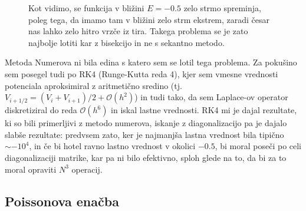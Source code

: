\documentclass[12pt, a4 paper]{article}
\begin{document}
\begin{figure}[H]\centering
	
	\caption{Kot vidimo, se funkcija v bli\v zini $E = -0.5$ zelo strmo spreminja, poleg tega, da imamo tam v bli\v zini
		zelo strm ekstrem, zaradi \v cesar nas lahko zelo hitro vrz\v ce iz tira. Takega problema se je zato
		najbolje lotiti kar z bisekcijo in ne s sekantno metodo.}
	\label{gr0}
\end{figure}

Metoda Numerova ni bila edina s katero sem se lotil tega problema. Za poku\v sino sem posegel tudi po RK4 (Runge-Kutta reda 4),
kjer sem vmesne vrednosti potenciala aproksimiral z aritmeti\v cno sredino (tj. $V_{i + 1/2} = (V_i + V_{i+1})/2 +
\mathcal{O}(h^2)$) in tudi tako, da sem Laplace-ov operator diskretiziral do reda $\mathcal{O}(h^6)$ in iskal lastne
vrednosti. RK4 mi je dajal rezultate, ki so bili primerljivi z metodo numerova, iskanje z diagonalizacijo pa je dajalo
slab\v se rezultate: predvsem zato, ker je najmanj\v sa lastna vrednost bila tipi\v cno $\sim -10^4$, in \v ce bi hotel
ravno lastno vrednost v okolici $-0.5$, bi moral pose\v ci po celi diagonalizaciji matrike, kar pa ni bilo efektivno, sploh
glede na to, da bi za to moral opraviti $N^3$ operacij.

\subsection{Poissonova ena\v cba}
\end{document}
